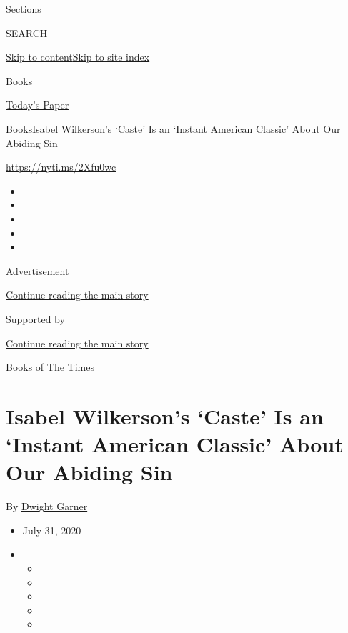 Sections

SEARCH

\protect\hyperlink{site-content}{Skip to
content}\protect\hyperlink{site-index}{Skip to site index}

\href{https://www.nytimes.com/section/books}{Books}

\href{https://myaccount.nytimes.com/auth/login?response_type=cookie\&client_id=vi}{}

\href{https://www.nytimes.com/section/todayspaper}{Today's Paper}

\href{/section/books}{Books}\textbar{}Isabel Wilkerson's `Caste' Is an
`Instant American Classic' About Our Abiding Sin

\url{https://nyti.ms/2Xfu0wc}

\begin{itemize}
\item
\item
\item
\item
\item
\end{itemize}

Advertisement

\protect\hyperlink{after-top}{Continue reading the main story}

Supported by

\protect\hyperlink{after-sponsor}{Continue reading the main story}

\href{/column/books-of-the-times}{Books of The Times}

\hypertarget{isabel-wilkersons-caste-is-an-instant-american-classic-about-our-abiding-sin}{%
\section{Isabel Wilkerson's `Caste' Is an `Instant American Classic'
About Our Abiding
Sin}\label{isabel-wilkersons-caste-is-an-instant-american-classic-about-our-abiding-sin}}

By \href{https://www.nytimes.com/by/dwight-garner}{Dwight Garner}

\begin{itemize}
\item
  July 31, 2020
\item
  \begin{itemize}
  \item
  \item
  \item
  \item
  \item
  \end{itemize}
\end{itemize}

